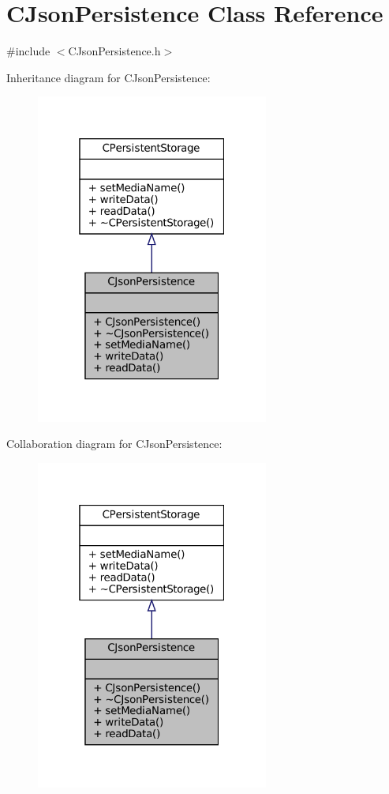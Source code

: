 \hypertarget{classCJsonPersistence}{}\section{C\+Json\+Persistence Class Reference}
\label{classCJsonPersistence}


{\ttfamily \#include $<$C\+Json\+Persistence.\+h$>$}



Inheritance diagram for C\+Json\+Persistence\+:
\nopagebreak
\begin{figure}[H]
\begin{center}
\leavevmode
\includegraphics[width=217pt]{classCJsonPersistence__inherit__graph}
\end{center}
\end{figure}


Collaboration diagram for C\+Json\+Persistence\+:
\nopagebreak
\begin{figure}[H]
\begin{center}
\leavevmode
\includegraphics[width=217pt]{classCJsonPersistence__coll__graph}
\end{center}
\end{figure}

